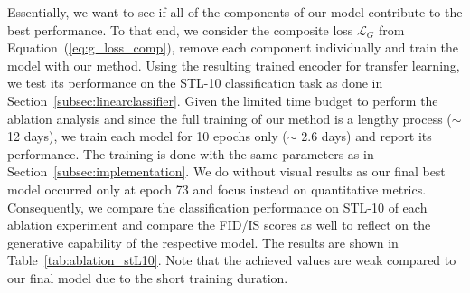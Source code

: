 \documentclass[a4paper,12pt]{report}
\begin{document}
Essentially, we want to see if all of the components of our model contribute to the best performance. To that end, we consider the composite loss $\mathcal{L}_{G}$ from Equation~(\ref{eq:g_loss_comp}), remove each component individually and train the model with our method. Using the resulting trained encoder for transfer learning, we test its performance on the STL-10 classification task as done in Section~\ref{subsec:linearclassifier}. Given the limited time budget to perform the ablation analysis and since the full training of our method is a lengthy process ($\sim$ 12 days), we train each model for 10 epochs only ($\sim$ 2.6 days) and report its performance. The training is done with the same parameters as in Section~\ref{subsec:implementation}. We do without visual results as our final best model occurred only at epoch 73 and focus instead on quantitative metrics. Consequently, we compare the classification performance on STL-10 of each ablation experiment and compare the FID/IS scores as well to reflect on the generative capability of the respective model. The results are shown in Table~\ref{tab:ablation_stL10}. Note that the achieved values are weak compared to our final model due to the short training duration.
\end{document}
